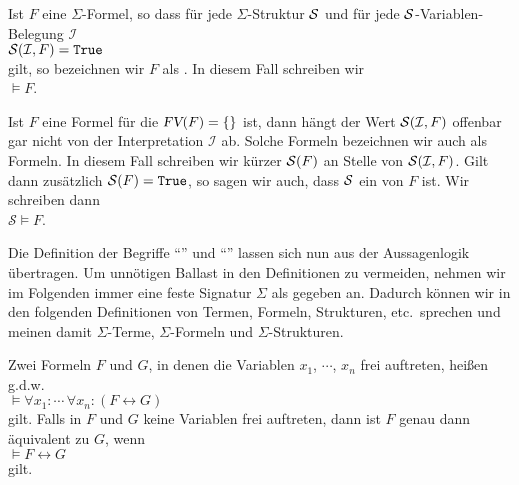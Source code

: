 \begin{Definition}[Allgemeingültig] 
    Ist $F$ eine $\Sigma$-Formel, so dass für jede $\Sigma$-Struktur $\mathcal{S}$ und für jede
    $\mathcal{S}$-Variablen-Belegung $\mathcal{I}$ \\[0.2cm]
    \hspace*{1.3cm} $\mathcal{S}(\mathcal{I}, F) = \mathtt{True}$ \\[0.2cm]
    gilt, so bezeichnen wir $F$ als .  In diesem Fall schreiben wir \\[0.2cm]
    \hspace*{1.3cm} $\models F$. 
    \eox
\end{Definition}

Ist $F$ eine Formel für die $\textsl{FV}(F) = \{\}$ ist, dann hängt der Wert $\mathcal{S}(\mathcal{I}, F)$ 
offenbar gar nicht von der Interpretation $\mathcal{I}$ ab.  Solche Formeln bezeichnen wir auch als 
 Formeln.   In diesem Fall schreiben wir kürzer  $\mathcal{S}(F)$
an Stelle von $\mathcal{S}(\mathcal{I}, F)$.  Gilt dann zusätzlich $\mathcal{S}(F) = \mathtt{True}$, 
so sagen wir auch, dass $\mathcal{S}$ ein   von $F$ ist.  Wir schreiben dann \\[0.2cm]
\hspace*{1.3cm} $\mathcal{S} \models F$. 
\vspace{0.1cm}

Die Definition der Begriffe ``'' und
``'' lassen sich nun aus der Aussagenlogik übertragen. 
Um unnötigen Ballast in den Definitionen zu vermeiden, nehmen wir im Folgenden immer eine
feste Signatur $\Sigma$ als gegeben an.  Dadurch können wir in den folgenden Definitionen
von Termen, Formeln, Strukturen, etc.~sprechen und meinen damit  $\Sigma$-Terme,
$\Sigma$-Formeln und $\Sigma$-Strukturen.

\begin{Definition}[Äquivalent] 
  Zwei Formeln $F$ und $G$, in denen die Variablen $x_1$, $\cdots$, $x_n$ frei auftreten, heißen
   g.d.w.  
  \\[0.2cm] 
  \hspace*{1.3cm}
  $\models \forall x_1: \cdots\, \forall x_n: (F \leftrightarrow G)$
  \\[0.2cm] 
  gilt.  Falls in $F$ und $G$ keine Variablen frei auftreten, dann ist $F$ genau dann äquivalent zu $G$, wenn
  \\[0.2cm]
  \hspace*{1.3cm}
  $\models F \leftrightarrow G$
  \\[0.2cm]
  gilt.
  \eox
\end{Definition}

